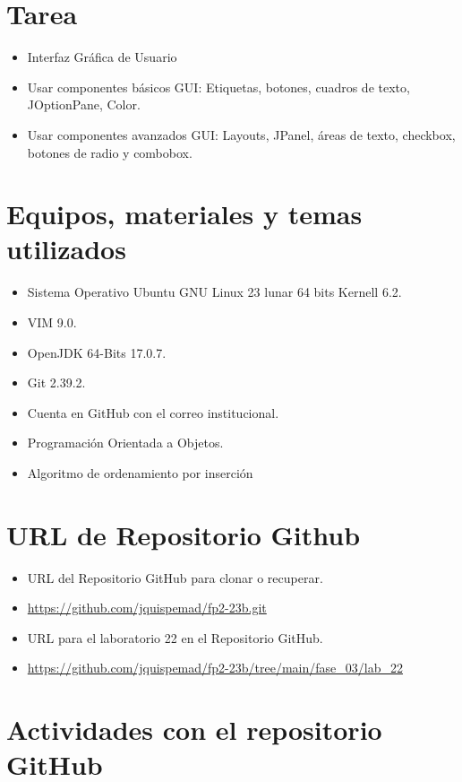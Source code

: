 \documentclass{article}
\begin{document}
	\section{Tarea}
	\begin{itemize}		
		\item Interfaz Gráfica de Usuario
		\item Usar componentes básicos GUI: Etiquetas, botones, cuadros de texto, JOptionPane, Color.
		\item Usar componentes avanzados GUI: Layouts, JPanel, áreas de texto, checkbox, botones de radio y combobox.
	\end{itemize}
		
	\section{Equipos, materiales y temas utilizados}
	\begin{itemize}
		\item Sistema Operativo Ubuntu GNU Linux 23 lunar 64 bits Kernell 6.2.
		\item VIM 9.0.
		\item OpenJDK 64-Bits 17.0.7.
		\item Git 2.39.2.
		\item Cuenta en GitHub con el correo institucional.
		\item Programación Orientada a Objetos.
		\item Algoritmo de ordenamiento por inserción	
	\end{itemize}
	
	\section{URL de Repositorio Github}
	\begin{itemize}
		\item URL del Repositorio GitHub para clonar o recuperar.
		\item \url{https://github.com/jquispemad/fp2-23b.git}
		\item URL para el laboratorio 22 en el Repositorio GitHub.
		\item \url{https://github.com/jquispemad/fp2-23b/tree/main/fase_03/lab_22}
	\end{itemize}
	
	\section{Actividades con el repositorio GitHub}
	
\end{document}
